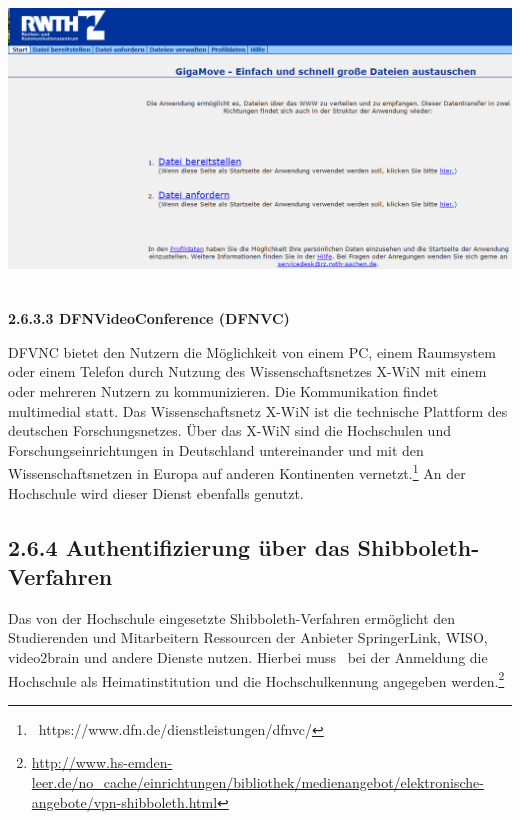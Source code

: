 \documentclass[a4paper]{article}
\makeatletter
\newcommand\textstyleAbsatzStandardschriftart[1]{#1}
\newcommand\textstyleHyperlink[1]{\textcolor{blue}{#1}}
\newcommand\captionof[1]{\def\@captype{#1}\caption}
\makeatother
\begin{document}
\bigskip

{\sffamily\color{black}
\includegraphics[width=15.501cm,height=8.033cm]{EntwurfKapitel2Gruppe220150528VW-img/EntwurfKapitel2Gruppe220150528VW-img011.png}
\captionof{figure}[https://gigamove.rz.rwth{}-aachen.de/instructions/wicket:pageMapName/wicket{}-0]{https://gigamove.rz.rwth-aachen.de/instructions/wicket:pageMapName/wicket-0}
\textbf{2.6.3.3 DFNVideoConference (DFNVC)}}


\bigskip

{\sffamily\mdseries\color{black}
\textstyleAbsatzStandardschriftart{DFVNC bietet den Nutzern die Möglichkeit von einem PC, einem Raumsystem oder einem
Telefon durch Nutzung des Wissenschaftsnetzes X-WiN mit einem oder mehreren Nutzern zu kommunizieren. Die Kommunikation
findet multimedial statt. Das Wissenschaftsnetz X-WiN ist die technische Plattform des deutschen
}\textstyleAbsatzStandardschriftart{Forschungsnetzes. Über das X-WiN sind die Hochschulen und Forschungseinrichtungen
in Deutschland untereinander und mit den Wissenschaftsnetzen in Europa auf anderen Kontinenten
vernetzt.}\footnote{\textstyleHyperlink{\ }https://www.dfn.de/dienstleistungen/dfnvc/}\textstyleAbsatzStandardschriftart{
An der Hochschule wird dieser Dienst ebenfalls genutzt.}}

\subsection[2.6.4 Authentifizierung über das Shibboleth{}-Verfahren]{\bfseries\color{black} 2.6.4 Authentifizierung über
das Shibboleth-Verfahren}
{\sffamily\color{black}
Das von der Hochschule eingesetzte Shibboleth-Verfahren ermöglicht den Studierenden und Mitarbeitern Ressourcen der
Anbieter SpringerLink, WISO, video2brain und andere Dienste nutzen. Hierbei muss \ bei der Anmeldung die Hochschule als
Heimatinstitution und die Hochschulkennung angegeben
werden.\footnote{\url{http://www.hs-emden-leer.de/no_cache/einrichtungen/bibliothek/medienangebot/elektronische-angebote/vpn-shibboleth.html}}}
\end{document}
